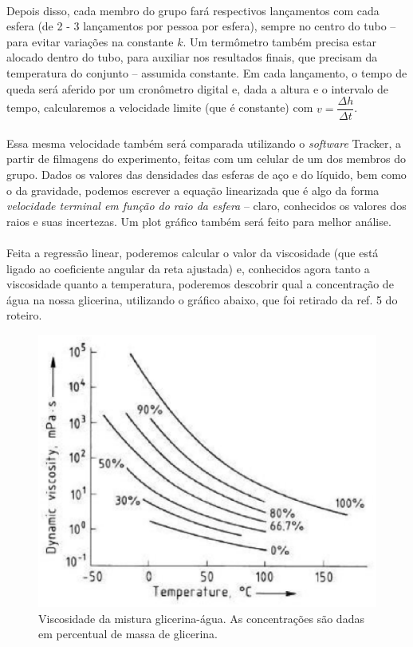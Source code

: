 \documentclass[a4paper, 11pt]{article}
\begin{document}
\begin{enumerate}
	\paragraph{}
Depois disso, cada membro do grupo fará respectivos lançamentos com cada esfera (de 2 - 3 lançamentos por pessoa por esfera), sempre no centro do tubo – para evitar variações na constante $k$. Um termômetro também precisa estar alocado dentro do tubo, para auxiliar nos resultados finais, que precisam da temperatura do conjunto – assumida constante. Em cada lançamento, o tempo de queda será aferido por um cronômetro digital e, dada a altura e o intervalo de tempo, calcularemos a velocidade limite (que é constante) com $v = \dfrac{\Delta h}{\Delta t}$. 
	\paragraph{}
Essa mesma velocidade também será comparada utilizando o \textit{software} Tracker, a partir de filmagens do experimento, feitas com um celular de um dos membros do grupo. Dados os valores das densidades das esferas de aço e do líquido, bem como o da gravidade, podemos escrever a equação linearizada que é algo da forma \textit{velocidade terminal em função do raio da esfera} – claro, conhecidos os valores dos raios e suas incertezas. Um plot gráfico também será feito para melhor análise. 
	\paragraph{}
Feita a regressão linear, poderemos calcular o valor da viscosidade (que está ligado ao coeficiente angular da reta ajustada) e, conhecidos agora tanto a viscosidade quanto a temperatura, poderemos descobrir qual a concentração de água na nossa glicerina, utilizando o gráfico abaixo, que foi retirado da ref. 5 do roteiro.


		\begin{figure}[!h]
		\centering
		\includegraphics[scale = 0.4]{fig2.eps}
		\caption{Viscosidade da mistura glicerina-água. As concentrações são dadas em percentual de massa de glicerina.}
		\end{figure}


\end{enumerate}
\end{document}
